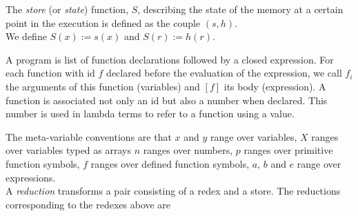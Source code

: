 \documentclass[12pt,a4paper]{article}
\begin{document}
The \emph{store} (or \emph{state}) function, $S$, describing the state of the memory at a certain point in the execution is defined as the couple $(s, h)$.\\
We define $S(x) := s(x)$ and $S(r) := h(r)$.

A program is list of function declarations followed by a closed expression. For each function with id $f$ declared before the evaluation of the expression, we call $f_i$ the arguments of this function (variables) and $[f]$ its body (expression). A function is associated not only an id but also a number when declared. This number is used in lambda terms to refer to a function using a value.

The meta-variable conventions are that $x$ and $y$ range over variables, $X$ ranges over variables typed as arrays $n$ ranges over numbers, $p$ ranges over primitive function symbols, $f$ ranges over defined function symbols, $a$, $b$ and $e$ range over expressions. \\

A \emph{reduction} transforms a pair consisting of a redex and a store. The reductions corresponding to the redexes above are
\end{document}
